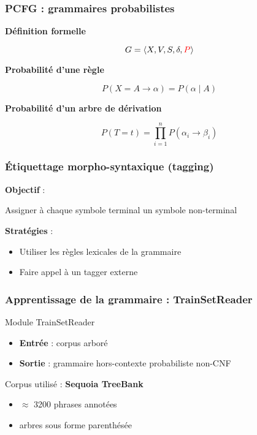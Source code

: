 \documentclass{beamer}
\begin{document}
\begin{frame}
\frametitle{PCFG : grammaires probabilistes}
\pause
\textbf{D\'efinition formelle}

$$G = \left< X, V, S, \delta, \textcolor{red}{P} \right>$$

\pause
\textbf{Probabilit\'e d'une r\`egle}

$$P(X = A \rightarrow \alpha) = P(\alpha \mid A)$$

\pause
\textbf{Probabilit\'e d'un arbre de d\'erivation}

$$P(T = t) = \prod_{i=1}^{n} P(\alpha_i \rightarrow \beta_i)$$

\end{frame}

\begin{frame}
\frametitle{\'Etiquettage morpho-syntaxique (tagging)}
\pause
\textbf{Objectif} :

\begin{center}Assigner \`a chaque symbole terminal un symbole non-terminal\end{center}

\vspace{1cm}

\pause
\textbf{Strat\'egies} :
\begin{itemize}
\pause
\item Utiliser les r\`egles lexicales de la grammaire
\pause
\item Faire appel \`a un tagger externe
\end{itemize}
\end{frame}

\begin{frame}
\frametitle{Apprentissage de la grammaire : TrainSetReader}
Module TrainSetReader
\pause
\begin{itemize}
  \item \textbf{Entr\'ee} : corpus arbor\'e
  \pause
  \item \textbf{Sortie} : grammaire hors-contexte probabiliste non-CNF
\end{itemize}

\pause
Corpus utilis\'e : \textbf{Sequoia TreeBank}
 \begin{itemize}
  \pause
  \item $\approx$ 3200 phrases annot\'ees
  \pause
  \item arbres sous forme parenth\'es\'ee
\end{itemize}
\end{frame}
\end{document}
